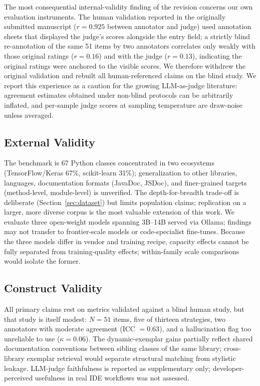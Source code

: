 \documentclass[pdflatex,sn-mathphys-ay]{sn-jnl}%
\theoremstyle{thmstyleone}%
\theoremstyle{thmstyletwo}%
\theoremstyle{thmstylethree}%
\begin{document}
The most consequential internal-validity finding of the revision concerns our own evaluation instruments. The human validation reported in the originally submitted manuscript ($r=0.925$ between annotator and judge) used annotation sheets that displayed the judge's scores alongside the entry field; a strictly blind re-annotation of the same 51 items by two annotators correlates only weakly with those original ratings ($r=0.16$) and with the judge ($r=0.13$), indicating the original ratings were anchored to the visible scores. We therefore withdrew the original validation and rebuilt all human-referenced claims on the blind study. We report this experience as a caution for the growing LLM-as-judge literature: agreement estimates obtained under non-blind protocols can be arbitrarily inflated, and per-sample judge scores at sampling temperature are draw-noise unless averaged.

\subsection{External Validity}
The benchmark is 67 Python classes concentrated in two ecosystems (TensorFlow/Keras 67\%, scikit-learn 31\%); generalization to other libraries, languages, documentation formats (JavaDoc, JSDoc), and finer-grained targets (method-level, module-level) is unverified. The depth-for-breadth trade-off is deliberate (Section~\ref{sec:dataset}) but limits population claims; replication on a larger, more diverse corpus is the most valuable extension of this work. We evaluate three open-weight models spanning 3B--14B served via Ollama; findings may not transfer to frontier-scale models or code-specialist fine-tunes. Because the three models differ in vendor and training recipe, capacity effects cannot be fully separated from training-quality effects; within-family scale comparisons would isolate the former.

\subsection{Construct Validity}
All primary claims rest on metrics validated against a blind human study, but that study is itself modest: $N=51$ items, five of thirteen strategies, two annotators with moderate agreement (ICC $=0.63$), and a hallucination flag too unreliable to use ($\kappa=0.06$). The dynamic-exemplar gains partially reflect shared documentation conventions between sibling classes of the same library; cross-library exemplar retrieval would separate structural matching from stylistic leakage. LLM-judge faithfulness is reported as supplementary only; developer-perceived usefulness in real IDE workflows was not assessed.
\end{document}
